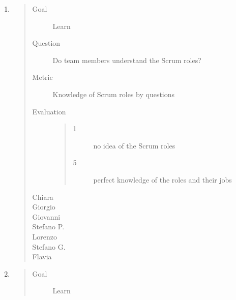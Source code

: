 \documentclass[letterpaper,10pt,italian]{sphinxmanual}
\begin{document}
\label{\detokenize{development/sprint0/index:risultati-della-partita-di-scrumble}}\begin{enumerate}
%
\item {} \begin{quote}\begin{description}
\item[{Goal}] \leavevmode
\sphinxAtStartPar
Learn

\item[{Question}] \leavevmode
\sphinxAtStartPar
Do team members understand the Scrum roles?

\item[{Metric}] \leavevmode
\sphinxAtStartPar
Knowledge of Scrum roles by questions

\item[{Evaluation}] \leavevmode\begin{quote}\begin{description}
\item[{1}] \leavevmode
\sphinxAtStartPar
no idea of the Scrum roles

\item[{5}] \leavevmode
\sphinxAtStartPar
perfect knowledge of the roles and their jobs

\end{description}\end{quote}

\item[{Chiara}] \leavevmode
{}

\item[{Giorgio}] \leavevmode
{}

\item[{Giovanni}] \leavevmode
{}

\item[{Stefano P.}] \leavevmode
{}

\item[{Lorenzo}] \leavevmode
{}

\item[{Stefano G.}] \leavevmode
{}

\item[{Flavia}] \leavevmode
{}

\end{description}\end{quote}

\item {} \begin{quote}\begin{description}
\item[{Goal}] \leavevmode
\sphinxAtStartPar
Learn


\end{description}
\end{quote}
\end{enumerate}
\end{document}
